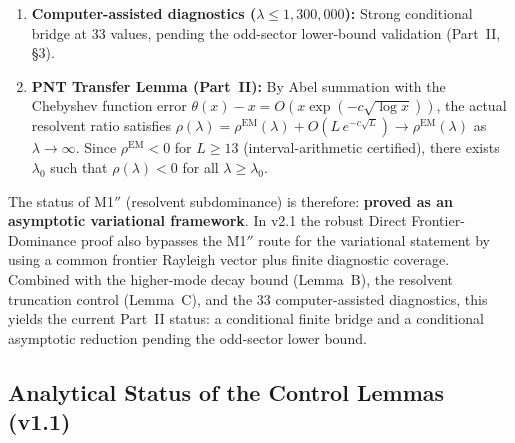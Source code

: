 \documentclass[12pt,a4paper]{article}
\theoremstyle{definition}
\theoremstyle{remark}
\begin{document}
\begin{enumerate}
  \item \textbf{Computer-assisted diagnostics ($\lambda \leq 1{,}300{,}000$):} Strong conditional bridge at $33$ values, pending the odd-sector lower-bound validation (Part~II, \S3).
  \item \textbf{PNT Transfer Lemma (Part~II):} By Abel summation with the Chebyshev function error $\theta(x) - x = O(x\exp(-c\sqrt{\log x}))$, the actual resolvent ratio satisfies $\rho(\lambda) = \rho^{\mathrm{EM}}(\lambda) + O(L\,e^{-c\sqrt{L}}) \to \rho^{\mathrm{EM}}(\lambda)$ as $\lambda \to \infty$. Since $\rho^{\mathrm{EM}} < 0$ for $L \geq 13$ (interval-arithmetic certified), there exists $\lambda_0$ such that $\rho(\lambda) < 0$ for all $\lambda \geq \lambda_0$.
\end{enumerate}

\noindent The status of M1$''$ (resolvent subdominance) is therefore:
\textbf{proved as an asymptotic variational framework}. In v2.1 the robust
Direct Frontier-Dominance proof also bypasses the M1$''$ route for the
variational statement by using a common frontier Rayleigh vector plus finite
diagnostic coverage. Combined with the higher-mode decay bound (Lemma~B), the
resolvent truncation control (Lemma~C), and the $33$ computer-assisted
diagnostics, this yields the current Part~II status: a conditional finite
bridge and a conditional asymptotic reduction pending the odd-sector lower
bound.

\subsection{Analytical Status of the Control Lemmas (v1.1)}
\end{document}
